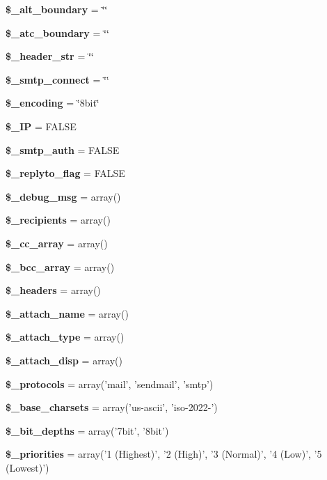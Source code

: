 \begin{DoxyCompactItemize}
\item 
{\bf \$\-\_\-alt\-\_\-boundary} = \char`\"{}\char`\"{}
\item 
{\bf \$\-\_\-atc\-\_\-boundary} = \char`\"{}\char`\"{}
\item 
{\bf \$\-\_\-header\-\_\-str} = \char`\"{}\char`\"{}
\item 
{\bf \$\-\_\-smtp\-\_\-connect} = \char`\"{}\char`\"{}
\item 
{\bf \$\-\_\-encoding} = \char`\"{}8bit\char`\"{}
\item 
{\bf \$\-\_\-\-I\-P} = F\-A\-L\-S\-E
\item 
{\bf \$\-\_\-smtp\-\_\-auth} = F\-A\-L\-S\-E
\item 
{\bf \$\-\_\-replyto\-\_\-flag} = F\-A\-L\-S\-E
\item 
{\bf \$\-\_\-debug\-\_\-msg} = array()
\item 
{\bf \$\-\_\-recipients} = array()
\item 
{\bf \$\-\_\-cc\-\_\-array} = array()
\item 
{\bf \$\-\_\-bcc\-\_\-array} = array()
\item 
{\bf \$\-\_\-headers} = array()
\item 
{\bf \$\-\_\-attach\-\_\-name} = array()
\item 
{\bf \$\-\_\-attach\-\_\-type} = array()
\item 
{\bf \$\-\_\-attach\-\_\-disp} = array()
\item 
{\bf \$\-\_\-protocols} = array('mail', 'sendmail', 'smtp')
\item 
{\bf \$\-\_\-base\-\_\-charsets} = array('us-\/ascii', 'iso-\/2022-\/')
\item 
{\bf \$\-\_\-bit\-\_\-depths} = array('7bit', '8bit')
\item 
{\bf \$\-\_\-priorities} = array('1 (Highest)', '2 (High)', '3 (Normal)', '4 (Low)', '5 (Lowest)')
\end{DoxyCompactItemize}

